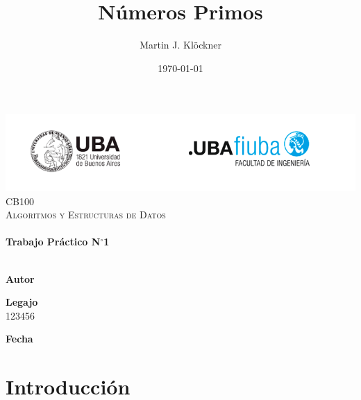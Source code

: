 \documentclass[12pt]{article}
\title{Números Primos}          %
\author{Martin J. Klöckner}     %
\date{\today}                   %
\makeatletter
\newcommand{\padron}{123456}    %
\newcommand{\tpnumber}{1}       %
\let\thetitle\@title
\let\theauthor\@author
\let\thedate\@date
\makeatother
\begin{document}
\begin{titlepage}
    \includegraphics[scale = 0.75]{img/logofiuba.png}\\[1.5 cm]	    %
    \centering
    \textsc{\Large CB100}\\[0.2 cm]
    \textsc{\large Algoritmos y Estructuras de Datos}\\[4 cm]
    \textcolor{cyan}{{\fontsize{40}{60}\selectfont \bfseries \thetitle}}\\[0.5cm]
    {\Large \bfseries Trabajo Práctico N$^\circ$\tpnumber}\\[5cm]


    \vfill
    \noindent\makebox[\linewidth]{\rule{\textwidth}{0.4pt}}\\[0.5cm]
    \begin{minipage}{.46\textwidth}
    \textbf{Autor}\\
    \theauthor
    \end{minipage}%
    \begin{minipage}{.34\textwidth}
    \textbf{Legajo}\\
    \padron
    \end{minipage}%
    \begin{minipage}{.2\textwidth}
     \begin{flushright}
        \textbf{Fecha}\\
        \thedate
    \end{flushright}
    \end{minipage}
\end{titlepage}


{
    \hypersetup{linkcolor=black} %
    \tableofcontents
    \pagebreak
}


\section{Introducción}
\end{document}
